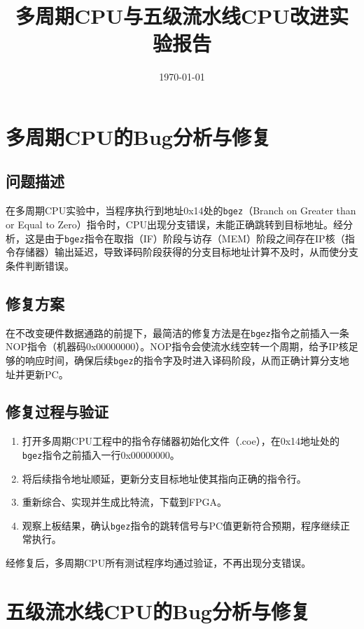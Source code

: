 \documentclass[12pt,a4paper]{ctexart}
\title{\heiti 多周期CPU与五级流水线CPU改进实验报告}
\date{\today}
\begin{document}
\maketitle
\tableofcontents
\newpage

\section{多周期CPU的Bug分析与修复}

\subsection{问题描述}
在多周期CPU实验中，当程序执行到地址0x14处的\texttt{bgez}（Branch on Greater than or Equal to Zero）指令时，CPU出现分支错误，未能正确跳转到目标地址。经分析，这是由于\texttt{bgez}指令在取指（IF）阶段与访存（MEM）阶段之间存在IP核（指令存储器）输出延迟，导致译码阶段获得的分支目标地址计算不及时，从而使分支条件判断错误。

\subsection{修复方案}
在不改变硬件数据通路的前提下，最简洁的修复方法是在\texttt{bgez}指令之前插入一条NOP指令（机器码0x00000000）。NOP指令会使流水线空转一个周期，给予IP核足够的响应时间，确保后续\texttt{bgez}的指令字及时进入译码阶段，从而正确计算分支地址并更新PC。

\subsection{修复过程与验证}
\begin{enumerate}
    \item 打开多周期CPU工程中的指令存储器初始化文件（.coe），在0x14地址处的\texttt{bgez}指令之前插入一行0x00000000。
    \item 将后续指令地址顺延，更新分支目标地址使其指向正确的指令行。
    \item 重新综合、实现并生成比特流，下载到FPGA。
    \item 观察上板结果，确认\texttt{bgez}指令的跳转信号与PC值更新符合预期，程序继续正常执行。
\end{enumerate}
经修复后，多周期CPU所有测试程序均通过验证，不再出现分支错误。

\section{五级流水线CPU的Bug分析与修复}
\end{document}
